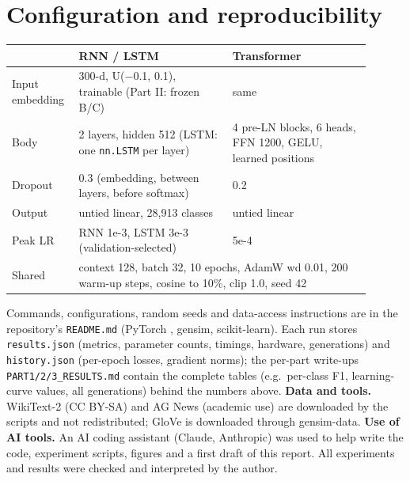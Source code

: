 \documentclass[10pt,a4paper]{article}
\begin{document}
\section{Configuration and reproducibility}\label{app:config}
\begin{table}[h]
\centering\small
\begin{tabular}{p{0.14\linewidth}p{0.40\linewidth}p{0.36\linewidth}}
\toprule
 & RNN / LSTM & Transformer\\
\midrule
Input embedding & 300-d, U($-$0.1, 0.1), trainable (Part II: frozen B/C) & same\\
Body & 2 layers, hidden 512 (LSTM: one \texttt{nn.LSTM} per layer) & 4 pre-LN blocks, 6 heads, FFN 1200, GELU, learned positions\\
Dropout & 0.3 (embedding, between layers, before softmax) & 0.2\\
Output & untied linear, 28,913 classes & untied linear\\
Peak LR & RNN 1e-3, LSTM 3e-3 (validation-selected) & 5e-4\\
\midrule
Shared & \multicolumn{2}{l}{context 128, batch 32, 10 epochs, AdamW \citep{loshchilov2019} wd 0.01, 200 warm-up steps, cosine to 10\%, clip 1.0, seed 42}\\
\bottomrule
\end{tabular}
\end{table}
Commands, configurations, random seeds and data-access instructions are in the repository's
\texttt{README.md} (PyTorch \citep{paszke2019}, gensim, scikit-learn). Each run stores \texttt{results.json}
(metrics, parameter counts, timings, hardware, generations) and \texttt{history.json} (per-epoch losses,
gradient norms); the per-part write-ups \texttt{PART1/2/3\_RESULTS.md} contain the complete tables
(e.g.\ per-class F1, learning-curve values, all generations) behind the numbers above.
\textbf{Data and tools.} WikiText-2 (CC BY-SA) and AG News (academic use) are downloaded by the scripts and
not redistributed; GloVe is downloaded through gensim-data. \textbf{Use of AI tools.} An AI coding assistant (Claude, Anthropic) was used to help write the code,
experiment scripts, figures and a first draft of this report. All experiments and results were checked and
interpreted by the author.
\end{document}
